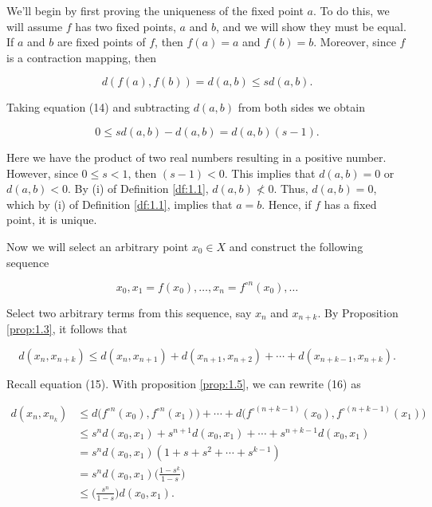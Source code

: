 \documentclass{article}
\makeatletter
\theoremstyle{definition}
\theoremstyle{remark}
\let\oldproofname=\proofname
\renewcommand{\proofname}{\bf{\textit{\oldproofname}}}
\theoremstyle{definition}
\renewenvironment{proof}[1][\proofname]{\par
  \pushQED{\qed}%
  \normalfont \topsep6\p@\@plus6\p@\relax
  \list{}{\leftmargin=0mm
          \rightmargin=0mm
          \settowidth{\itemindent}{\itshape#1}%
          \labelwidth=\itemindent
          \parsep=0pt \listparindent=0mm%
  }
  \item[\hskip\labelsep
        \itshape
    #1\@addpunct{.}]\ignorespaces
}{%
  \popQED\endlist\@endpefalse
}
\makeatother
\begin{document}
    \begin{proof}
        We'll begin by first proving the uniqueness of the fixed point $a$. To do this, we will assume $f$ has two fixed points, $a$ and $b$, and we will show they must be equal. If $a$ and $b$ are fixed points of $f$, then $f(a)=a$ and $f(b)=b$. Moreover, since $f$ is a contraction mapping, then 
        
        \begin{equation}\label{eq:14}
            d(f(a),f(b))=d(a,b)\leq sd(a,b).
        \end{equation}
        
        Taking equation (14) and subtracting $d(a,b)$ from both sides we obtain
        
        \begin{equation*}
            0\leq sd(a,b)-d(a,b)=d(a,b)(s-1).
        \end{equation*}
        
        Here we have the product of two real numbers resulting in a positive number. However, since $0\leq s<1$, then $(s-1)<0$. This implies that $d(a,b)=0$ or $d(a,b)<0$. By (i) of Definition \ref{df:1.1}, $d(a,b)\not<0$. Thus, $d(a,b)=0$, which by (i) of Definition \ref{df:1.1}, implies that $a=b$. Hence, if $f$ has a fixed point, it is unique.\par\hspace{4mm} Now we will select an arbitrary point $x_0\in X$ and construct the following sequence
        
        \begin{equation}
            x_0, x_1=f(x_0),\dots, x_n=f^{\circ n}(x_0),\dots
        \end{equation}
        
        Select two arbitrary terms from this sequence, say $x_n$ and $x_{n+k}$. By Proposition \ref{prop:1.3}, it follows that 
        
        \begin{equation}
            d(x_n,x_{n+k})\leq d(x_n,x_{n+1})+d(x_{n+1},x_{n+2})+\cdots+d(x_{n+k-1},x_{n+k}).
        \end{equation}
        
        Recall equation (15). With proposition \ref{prop:1.5}, we can rewrite (16) as
        
        \begin{equation*}
            \begin{split}
                d(x_n,x_{n_k})&\leq d\big(f^{\circ n}(x_0), f^{\circ n}(x_1)\big)+\cdots+d\big(f^{\circ(n+k-1)}(x_0),f^{\circ(n+k-1)}(x_1)\big) \\
                &\leq s^nd(x_0,x_1)+s^{n+1}d(x_0,x_1)+\cdots+s^{n+k-1}d(x_0,x_1) \\
                &=s^nd(x_0,x_1)(1+s+s^2+\cdots+s^{k-1}) \\
                &=s^nd(x_0,x_1)\bigg(\frac{1-s^k}{1-s}\bigg) \\
                &\leq \bigg(\frac{s^n}{1-s}\bigg)d(x_0,x_1).
            \end{split}
        \end{equation*}
        

\end{proof}
\end{document}
